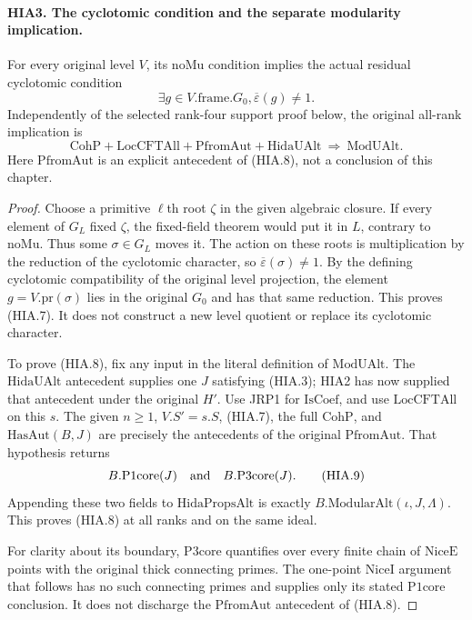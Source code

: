 \paragraph{HIA3. The cyclotomic condition and the separate modularity implication.}
\label{claim:HIA3}
For every original level \(V\), its \(\mathrm{noMu}\)
condition implies the actual residual cyclotomic condition
\[
 \exists g\in V.\mathrm{frame}.G_0,
                 \overline\varepsilon(g)\ne1.
 \tag{HIA.7}
\]
Independently of the selected rank-four support proof below,
the original all-rank implication is
\[
 \mathrm{CohP}+\mathrm{LocCFTAll}+\mathrm{PfromAut}
              +\mathrm{HidaUAlt}
                       \ \Longrightarrow\ \mathrm{ModUAlt}.
 \tag{HIA.8}
\]
Here \(\mathrm{PfromAut}\) is an explicit antecedent of
(HIA.8), not a conclusion of this chapter.
\begin{proof}
Choose a primitive \(\ell\)th root \(\zeta\) in the
given algebraic closure.  If every element of \(G_L\)
fixed \(\zeta\), the fixed-field theorem would put it
in \(L\), contrary to \(\mathrm{noMu}\).  Thus some
\(\sigma\in G_L\) moves it.  The action on these roots
is multiplication by the reduction of the cyclotomic
character, so \(\overline\varepsilon(\sigma)\ne1\).
By the defining cyclotomic compatibility of the original
level projection, the element \(g=V.\mathrm{pr}(\sigma)\)
lies in the original \(G_0\) and has that same reduction.
This proves (HIA.7).  It does not construct a new level
quotient or replace its cyclotomic character.

To prove (HIA.8), fix any input in the literal definition
of \(\mathrm{ModUAlt}\).  The \(\mathrm{HidaUAlt}\)
antecedent supplies one \(J\) satisfying (HIA.3); HIA2
has now supplied that antecedent under the original \(H'\).
Use JRP1 for \(\mathrm{IsCoef}\), and use
\(\mathrm{LocCFTAll}\) on this \(s\).
The given \(n\geq1\), \(V.S'=s.S\), (HIA.7), the full
\(\mathrm{CohP}\), and \(\mathrm{HasAut}(B,J)\) are
precisely the antecedents of the original
\(\mathrm{PfromAut}\).  That hypothesis returns
\[
                       B.\mathrm{P1core}(J)
                          \quad\hbox{and}\quad
                       B.\mathrm{P3core}(J).
 \tag{HIA.9}
\]
Appending these two fields to \(\mathrm{HidaPropsAlt}\)
is exactly \(B.\mathrm{ModularAlt}(\iota,J,\Lambda)\).
This proves (HIA.8) at all ranks and on the same ideal.

For clarity about its boundary, \(\mathrm{P3core}\)
quantifies over every finite chain of \(\mathrm{NiceE}\)
points with the original thick connecting primes.  The
one-point \(\mathrm{NiceI}\) argument that follows has
no such connecting primes and supplies only its stated
\(\mathrm{P1core}\) conclusion.  It does not discharge
the \(\mathrm{PfromAut}\) antecedent of (HIA.8).
\end{proof}

